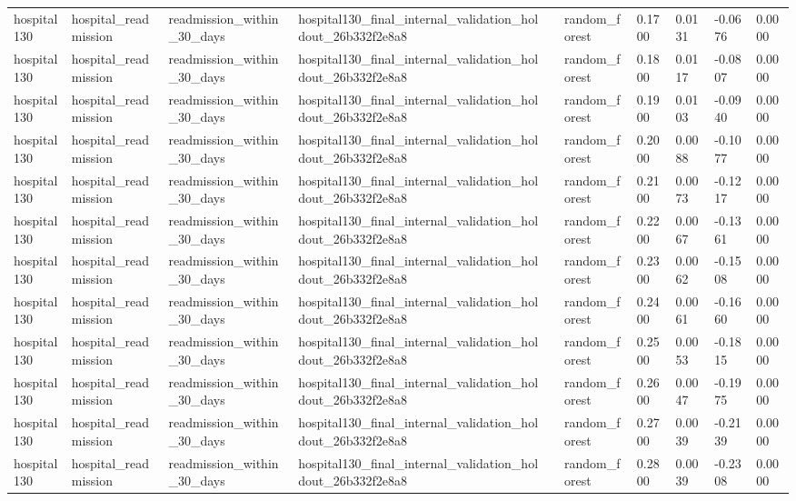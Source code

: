 \begin{tabular}{llllllllll}
hospital130 & hospital\_readmission & readmission\_within\_30\_days & hospital130\_final\_internal\_validation\_holdout\_26b332f2e8a8 &  & random\_forest & 0.1700 & 0.0131 & -0.0676 & 0.0000 \\
hospital130 & hospital\_readmission & readmission\_within\_30\_days & hospital130\_final\_internal\_validation\_holdout\_26b332f2e8a8 &  & random\_forest & 0.1800 & 0.0117 & -0.0807 & 0.0000 \\
hospital130 & hospital\_readmission & readmission\_within\_30\_days & hospital130\_final\_internal\_validation\_holdout\_26b332f2e8a8 &  & random\_forest & 0.1900 & 0.0103 & -0.0940 & 0.0000 \\
hospital130 & hospital\_readmission & readmission\_within\_30\_days & hospital130\_final\_internal\_validation\_holdout\_26b332f2e8a8 &  & random\_forest & 0.2000 & 0.0088 & -0.1077 & 0.0000 \\
hospital130 & hospital\_readmission & readmission\_within\_30\_days & hospital130\_final\_internal\_validation\_holdout\_26b332f2e8a8 &  & random\_forest & 0.2100 & 0.0073 & -0.1217 & 0.0000 \\
hospital130 & hospital\_readmission & readmission\_within\_30\_days & hospital130\_final\_internal\_validation\_holdout\_26b332f2e8a8 &  & random\_forest & 0.2200 & 0.0067 & -0.1361 & 0.0000 \\
hospital130 & hospital\_readmission & readmission\_within\_30\_days & hospital130\_final\_internal\_validation\_holdout\_26b332f2e8a8 &  & random\_forest & 0.2300 & 0.0062 & -0.1508 & 0.0000 \\
hospital130 & hospital\_readmission & readmission\_within\_30\_days & hospital130\_final\_internal\_validation\_holdout\_26b332f2e8a8 &  & random\_forest & 0.2400 & 0.0061 & -0.1660 & 0.0000 \\
hospital130 & hospital\_readmission & readmission\_within\_30\_days & hospital130\_final\_internal\_validation\_holdout\_26b332f2e8a8 &  & random\_forest & 0.2500 & 0.0053 & -0.1815 & 0.0000 \\
hospital130 & hospital\_readmission & readmission\_within\_30\_days & hospital130\_final\_internal\_validation\_holdout\_26b332f2e8a8 &  & random\_forest & 0.2600 & 0.0047 & -0.1975 & 0.0000 \\
hospital130 & hospital\_readmission & readmission\_within\_30\_days & hospital130\_final\_internal\_validation\_holdout\_26b332f2e8a8 &  & random\_forest & 0.2700 & 0.0039 & -0.2139 & 0.0000 \\
hospital130 & hospital\_readmission & readmission\_within\_30\_days & hospital130\_final\_internal\_validation\_holdout\_26b332f2e8a8 &  & random\_forest & 0.2800 & 0.0039 & -0.2308 & 0.0000 \\

\end{tabular}
